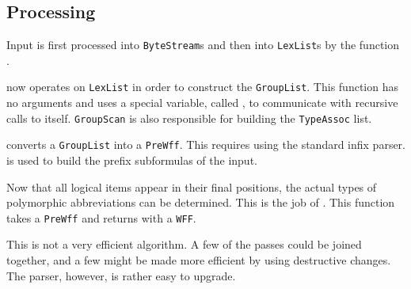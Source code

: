 \subsection{Processing}

Input is first processed into {\tt ByteStream}s and then into {\tt LexList}s
by the function .

 now operates on {\tt LexList} in order to construct the
{\tt GroupList}.  This function has no arguments and uses a special
variable, called , to communicate with
recursive calls to itself.  {\tt GroupScan} is also responsible for building
the {\tt TypeAssoc} list.

 converts a {\tt GroupList} into a {\tt PreWff}.
This requires using
the standard infix parser.   is used to build the prefix
subformulas of the input. 

Now that all logical items appear in their final positions, the actual
types of polymorphic abbreviations can be determined.  This is the job
of .  This function takes a {\tt PreWff} and 
returns with a {\tt WFF}.

This is not a very efficient algorithm. A few of the passes could be joined
together, and a few might be made more efficient by using destructive
changes.  The parser, however, is rather easy to upgrade.


